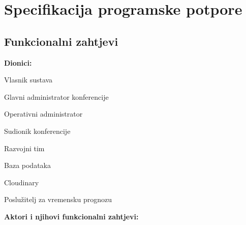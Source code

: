 \chapter{Specifikacija programske potpore}
		
	\section{Funkcionalni zahtjevi}
			
			
			\noindent \textbf{Dionici:}
			
			\begin{packed_enum}
				
				\item Vlasnik sustava
				\item Glavni administrator konferencije				
				\item Operativni administrator
				\item Sudionik konferencije
				\item Razvojni tim
				\item Baza podataka
                \item Cloudinary
                \item Poslužitelj za vremensku prognozu
				
			\end{packed_enum}
			
			\noindent \textbf{Aktori i njihovi funkcionalni zahtjevi:}
			
